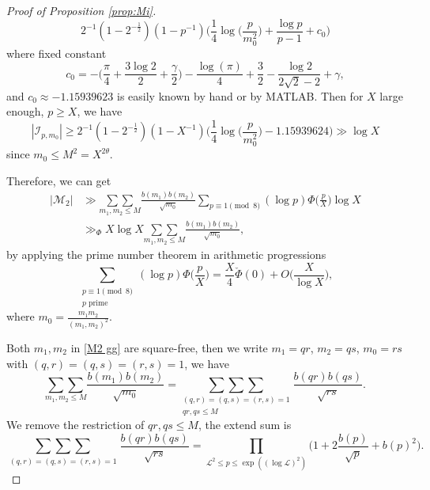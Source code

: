 \documentclass[12pt,reqno]{amsart}
\numberwithin{equation}{section}
\theoremstyle{plain}
\theoremstyle{definition}
\theoremstyle{remark}
\begin{document}
\begin{proof}[Proof of Proposition \ref{prop:Mi}]
\begin{equation}
  2^{-1}(1-2^{-\frac{1}{2}})
(1-p^{-1})\Big(\frac{1}{4}\log\bigg(\frac{p}{m_0^2}\bigg)
+\frac{\log p}{p-1}+ c_0
\Big)
\end{equation}
where fixed constant
\begin{equation*}
  c_0=-\bigg(\frac{\pi}{4}+\frac{3\log 2}{2} +\frac{\gamma}{2}\bigg)
-\frac{\log(\pi)}{4}
+\frac{3}{2}-\frac{\log 2}{2\sqrt{2}-2}+\gamma,
\end{equation*}
and $c_0\approx -1.15939623$ is easily known by hand or by MATLAB.
Then for $X$ large enough, $p\geq X$, we have
\begin{equation*}
  |\mathcal{I}_{p,m_0}|\geq
  2^{-1}(1-2^{-\frac{1}{2}})
(1-X^{-1})\bigg(\frac{1}{4}
\log\bigg(\frac{p}{m_0^2}\bigg)
-1.15939624\bigg)
\gg \log X
\end{equation*}
since $m_0\le M^2=X^{2\theta}$.

Therefore, we can get
\begin{equation}\label{M2 gg}
\begin{split}
  |\mathcal{M}_2|&\gg
 \underset{m_1,m_2\leq M}{\sum\sum}
  \frac{b(m_1)b(m_2)}{\sqrt{m_0}}
  \sum_{p\equiv 1\pmod 8 }
  (\log p)\Phi\bigg(\frac{p}{X}\bigg)\log X\\
  &\gg_\Phi X\log X
  \underset{m_1,m_2\leq M}{\sum\sum}
  \frac{b(m_1)b(m_2)}{\sqrt{m_0}},
  \end{split}
\end{equation}
by applying the prime number theorem in arithmetic progressions
\begin{equation*}
  \sum_{\substack{p\equiv 1\pmod 8 \\ p \textrm{ prime }}}
  (\log p)\Phi\bigg(\frac{p}{X}\bigg)
  =\frac{X}{4}\check{\Phi}(0)+O\bigg(\frac{X}{\log X}\bigg),
\end{equation*}
where $m_0=\frac{m_1m_2}{(m_1, m_2)^2}$.

Both $m_1,m_2$ in \eqref{M2 gg} are square-free, then we write $m_1=qr$, $m_2=qs$, $m_0=rs$ with $(q,r)=(q,s)=(r,s)=1$, we have
\begin{equation}\label{truncated sum}
    \underset{m_1,m_2\leq M}{\sum\sum}
  \frac{b(m_1)b(m_2)}{\sqrt{m_0}}
  =\underset{\substack{(q,r)=(q,s)=(r,s)=1
  \\qr,qs\leq M}}
  {\sum\sum\sum}
  \frac{b(qr)b(qs)}{\sqrt{rs}}.
\end{equation}
We remove the restriction of $qr,qs\leq M$, the extend sum is
\begin{equation}\label{complete sum}
\underset{\substack{(q,r)=(q,s)=(r,s)=1}}
  {\sum\sum\sum}
  \frac{b(qr)b(qs)}{\sqrt{rs}}
    =\prod_{\mathcal{L}^2\leq p \leq \exp((\log \mathcal{L})^2)}
  \bigg(1+2\frac{b(p)}{\sqrt{p}}+b(p)^2\bigg).
\end{equation}


\end{proof}
\end{document}

